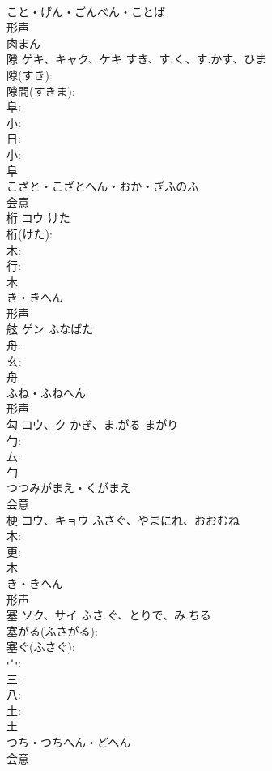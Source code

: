 \documentclass[8pt]{extreport}
\begin{document}
\begin{CJK}{UTF8}{min}
\\	こと・げん・ごんべん・ことば	
\\	形声 
\\	肉まん 
\\	隙	ゲキ、キャク、ケキ	すき、す.く、す.かす、ひま		
\\	隙(すき): 
\\	隙間(すきま): 
\\	阜: 
\\	小: 
\\	日: 
\\	小: 
\\	阜	
\\	こざと・こざとへん・おか・ぎふのふ	
\\	会意 
\\	桁	コウ	けた		
\\	桁(けた): 
\\	木: 
\\	行: 
\\	木	
\\	き・きへん	
\\	形声 
\\	舷	ゲン	ふなばた		
\\	舟: 
\\	玄: 
\\	舟	
\\	ふね・ふねへん	
\\	形声 
\\	勾	コウ、ク	かぎ、ま.がる	まがり	
\\	勹: 
\\	厶: 
\\	勹	
\\	つつみがまえ・くがまえ	
\\	会意 
\\	梗	コウ、キョウ	ふさぐ、やまにれ、おおむね		
\\	木: 
\\	更: 
\\	木	
\\	き・きへん	
\\	形声 
\\	塞	ソク、サイ	ふさ.ぐ、とりで、み.ちる		
\\	塞がる(ふさがる): 
\\	塞ぐ(ふさぐ): 
\\	宀: 
\\	三: 
\\	八: 
\\	土: 
\\	土	
\\	つち・つちへん・どへん	
\\	会意 

\end{CJK}
\end{document}
